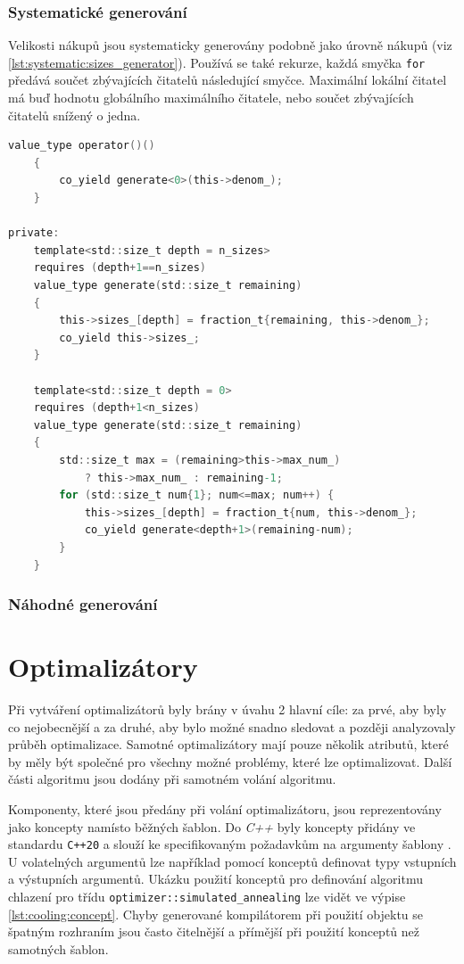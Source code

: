 \subsection{Systematické generování}
Velikosti nákupů jsou systematicky generovány podobně jako úrovně nákupů (viz \ref{lst:systematic:sizes_generator}).
Používá se také rekurze, každá smyčka \texttt{for} předává součet zbývajících čitatelů následující smyčce.
Maximální lokální čitatel má buď hodnotu globálního maximálního čitatele, nebo součet zbývajících čitatelů snížený o jedna.

\begin{lstlisting}[caption={~Metody pro systematické generování velikostí nákupu},label={lst:systematic:sizes_generator},captionpos=t,abovecaptionskip=-\medskipamount,belowcaptionskip=\medskipamount,language=C]
    value_type operator()()
    {
        co_yield generate<0>(this->denom_);
    }

private:
    template<std::size_t depth = n_sizes>
    requires (depth+1==n_sizes)
    value_type generate(std::size_t remaining)
    {
        this->sizes_[depth] = fraction_t{remaining, this->denom_};
        co_yield this->sizes_;
    }

    template<std::size_t depth = 0>
    requires (depth+1<n_sizes)
    value_type generate(std::size_t remaining)
    {
        std::size_t max = (remaining>this->max_num_)
            ? this->max_num_ : remaining-1;
        for (std::size_t num{1}; num<=max; num++) {
            this->sizes_[depth] = fraction_t{num, this->denom_};
            co_yield generate<depth+1>(remaining-num);
        }
    }
\end{lstlisting}

\subsection{Náhodné generování}

\chapter{Optimalizátory}
Při vytváření optimalizátorů byly brány v úvahu 2 hlavní cíle: za prvé, aby byly co nejobecnější a za druhé, aby bylo možné snadno sledovat a později analyzovaly průběh optimalizace.
Samotné optimalizátory mají pouze několik atributů, které by měly být společné pro všechny možné problémy, které lze optimalizovat.
Další části algoritmu jsou dodány při samotném volání algoritmu.

Komponenty, které jsou předány při volání optimalizátoru, jsou reprezentovány jako koncepty namísto běžných šablon.
Do \textit{C++} byly koncepty přidány ve standardu \texttt{C++20} a slouží ke specifikovaným požadavkům na argumenty šablony \cite{concepts}.
U volatelných argumentů lze například pomocí konceptů definovat typy vstupních a výstupních argumentů.
Ukázku použití konceptů pro definování algoritmu chlazení pro třídu \texttt{optimizer::simulated\_annealing} lze vidět ve výpise \ref{lst:cooling:concept}.
Chyby generované kompilátorem při použití objektu se špatným rozhraním jsou často čitelnější a přímější při použití konceptů než samotných šablon.


